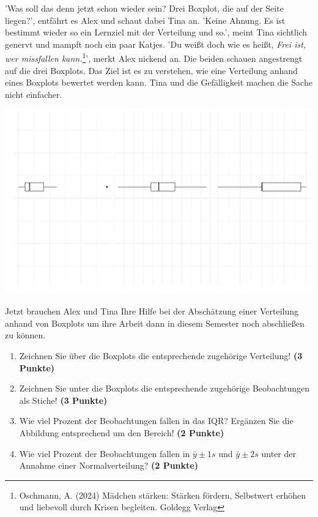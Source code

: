 \documentclass[a4paper, 9pt]{scrartcl}\usepackage[]{graphicx}\usepackage[]{xcolor}
\makeatletter
\def\maxwidth{ %
  \ifdim\Gin@nat@width>\linewidth
    \linewidth
  \else
    \Gin@nat@width
  \fi
}
\makeatother
\begin{document}
'Was soll das denn jetzt schon wieder sein? Drei Boxplot, die auf der Seite liegen?', entfährt es Alex und schaut dabei Tina an. 'Keine Ahnung. Es ist bestimmt wieder so ein Lernziel mit der Verteilung und so.', meint Tina sichtlich genervt und mampft noch ein paar Katjes. 'Du weißt doch wie es heißt, \textit{Frei ist, wer missfallen kann.}\footnote{Oschmann, A. (2024) Mädchen stärken: Stärken fördern, Selbstwert erhöhen und liebevoll durch Krisen begleiten. Goldegg Verlag}', merkt Alex nickend an. Die beiden schauen angestrengt auf die drei Boxplots. Das Ziel ist es zu verstehen, wie eine Verteilung anhand eines Boxplots bewertet werden kann. Tina und die Gefälligkeit machen die Sache nicht einfacher.



{\centering \includegraphics[width=\maxwidth]{img/desc-stat-11-1} 

}




Jetzt brauchen Alex und Tina Ihre Hilfe bei der Abschätzung einer Verteilung anhand von Boxplots um ihre Arbeit dann in diesem Semester noch abschließen zu können.

\begin{enumerate}
\item Zeichnen Sie über die Boxplots die entsprechende zugehörige Verteilung! \textbf{(3 Punkte)} 
\item Zeichnen Sie unter die Boxplots die entsprechende zugehörige Beobachtungen als Stiche! \textbf{(3 Punkte)}
\item Wie viel Prozent der Beobachtungen fallen in das IQR? Ergänzen Sie die Abbildung entsprechend um den Bereich! \textbf{(2 Punkte)}
\item Wie viel Prozent der Beobachtungen fallen in $\bar{y} \pm 1s$ und $\bar{y} \pm 2s$  unter der Annahme einer Normalverteilung? \textbf{(2 Punkte)}
\end{enumerate} 
\clearpage
\end{document}
